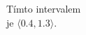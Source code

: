 \documentclass[preview]{standalone}
\begin{document}
\begin{center}
Tímto intervalem\\ je  $\langle 0.4,1.3 \rangle$.
\end{center}
\end{document}
